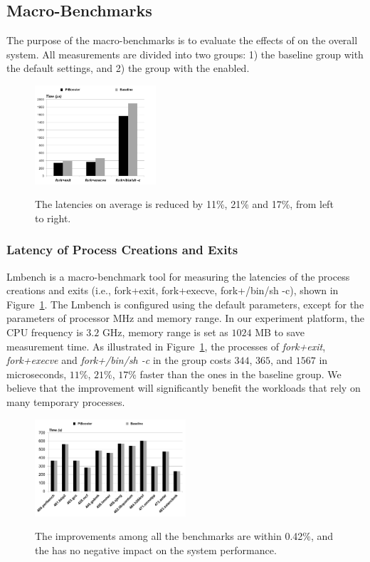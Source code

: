 \subsection{Macro-Benchmarks}
The purpose of the macro-benchmarks is to evaluate the effects of \name on the overall system.
All measurements are divided into two groups: 1) the baseline group with the default settings, and 2) the \name group with the \name enabled.

\begin{figure}[htp]
\centering
\includegraphics[width=0.4\textwidth]{image/macro/lmbench.png} \\
\caption{The latencies on average is reduced by 11\%, 21\% and 17\%, from left to right.}
\label{fig:lmbench}
\end{figure}

\subsubsection{Latency of Process Creations and Exits}
Lmbench is a macro-benchmark tool for measuring the latencies of the process creations and exits (i.e., fork+exit, fork+execve, fork+/bin/sh -c), shown in Figure~\ref{fig:lmbench}.
The Lmbench is configured using the default parameters, except for the parameters of processor MHz and memory range.
In our experiment platform, the CPU frequency is $3.2$ GHz, memory range is set as $1024$ MB to save measurement time.
As illustrated in Figure~\ref{fig:lmbench}, the processes of \emph{fork+exit}, \emph{fork+execve} and \emph{fork+/bin/sh -c} in the \name group costs $344$, $365$, and $1567$ in microseconds, $11$\%, $21$\%, $17$\% faster than the ones in the baseline group.
We believe that the improvement will significantly benefit the workloads that rely on many temporary processes.

\begin{figure}[htp]
\centering
\includegraphics[width=0.5\textwidth]{image/macro/spec.png} \\
\caption{The improvements among all the benchmarks are within 0.42\%, and the \name has no negative impact on the system performance.}
\label{fig:spec}
\end{figure}


